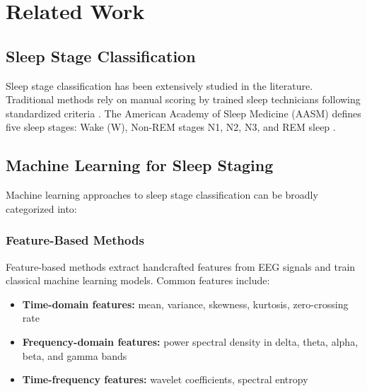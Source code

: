 \chapter{Related Work}
\label{ch:related_work}


\section{Sleep Stage Classification}
\label{sec:sleep_classification}

Sleep stage classification has been extensively studied in the literature. Traditional methods rely on manual scoring by trained sleep technicians following standardized criteria \cite{TODO_ADD_RECHTSCHAFFEN_KALES}. The American Academy of Sleep Medicine (AASM) defines five sleep stages: Wake (W), Non-REM stages N1, N2, N3, and REM sleep \cite{TODO_ADD_AASM}.


\section{Machine Learning for Sleep Staging}
\label{sec:ml_sleep}

Machine learning approaches to sleep stage classification can be broadly categorized into:

\subsection{Feature-Based Methods}
\label{subsec:feature_based}

Feature-based methods extract handcrafted features from EEG signals and train classical machine learning models. Common features include:

\begin{itemize}
    \item \textbf{Time-domain features:} mean, variance, skewness, kurtosis, zero-crossing rate
    \item \textbf{Frequency-domain features:} power spectral density in delta, theta, alpha, beta, and gamma bands
    \item \textbf{Time-frequency features:} wavelet coefficients, spectral entropy
\end{itemize}

